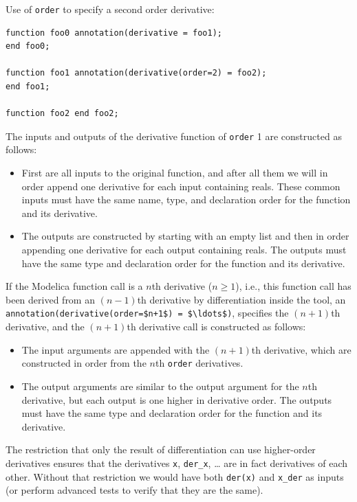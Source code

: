 \begin{example}
Use of {\lstinline!order!} to specify a second order derivative:
\begin{lstlisting}[language=modelica]
function foo0 annotation(derivative = foo1);
end foo0;

function foo1 annotation(derivative(order=2) = foo2);
end foo1;

function foo2 end foo2;
\end{lstlisting}
\end{example}

The inputs and outputs of the derivative function of {\lstinline!order!} 1 are constructed as follows:
\begin{itemize}
\item
  First are all inputs to the original function, and after all them we will in order append one derivative for each input containing reals.
  These common inputs must have the same name, type, and declaration order for the function and its derivative.
\item
  The outputs are constructed by starting with an empty list and then in order appending one derivative for each output containing reals.
  The outputs must have the same type and declaration order for the function and its derivative.
\end{itemize}

If the Modelica function call is a $n$th derivative ($n \geq 1$), i.e., this function call has been derived from an $(n-1)$th derivative by differentiation inside the tool, an {\lstinline!annotation(derivative(order=$n+1$) = $\ldots$)!}, specifies the $(n+1)$th derivative, and the $(n+1)$th derivative call is constructed as follows:
\begin{itemize}
\item
  The input arguments are appended with the $(n+1)$th derivative, which are constructed in order from the $n$th {\lstinline!order!} derivatives.
\item
  The output arguments are similar to the output argument for the $n$th derivative, but each output is one higher in derivative order.
  The outputs must have the same type and declaration order for the function and its derivative.
\end{itemize}

\begin{nonnormative}
The restriction that only the result of differentiation can use higher-order derivatives ensures that the derivatives {\lstinline!x!}, {\lstinline!der_x!}, \ldots{} are in fact derivatives of each other.
Without that restriction we would have both {\lstinline!der(x)!} and {\lstinline!x_der!} as inputs (or perform advanced tests to verify that they are the same).
\end{nonnormative}

